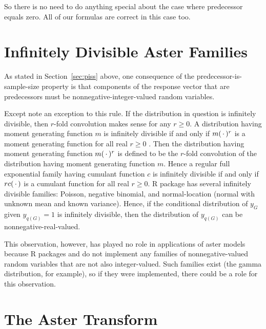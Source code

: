 So there is no need to do anything special about the case where predecessor
equals zero.  All of our formulas are correct in this case too.

\section{Infinitely Divisible Aster Families}
\label{sec:infinitely-divisible}

As stated in Section~\ref{sec:piss} above,
one consequence of the predecessor-is-sample-size property is that
components of the response vector
that are predecessors must be
nonnegative-integer-valued random variables.

Except \citet{aster1} note an exception to this rule.  If the distribution
in question is infinitely divisible, then $r$-fold convolution makes sense
for any $r \ge 0$.  A distribution having moment generating function $m$
is infinitely divisible if and only if $m(\,\cdot\,)^r$ is a moment generating
function for all real $r \ge 0$ \citep[Corollary~4.2.2]{cuppens}.
Then the distribution having moment
generating function $m(\,\cdot\,)^r$ is defined to be the $r$-fold convolution
of the distribution having moment generating function $m$.
Hence a regular full exponential family having cumulant function $c$
is infinitely divisible if and only if $r c(\,\cdot\,)$ is a cumulant
function for all real $r \ge 0$.
R package  \citep{aster-package} has several infinitely divisible
families: Poisson, negative binomial, and normal-location
(normal with unknown mean and known variance).
Hence, if the conditional distribution of $y_G$ given $y_{q(G)} = 1$
is infinitely divisible, then
the distribution of $y_{q(G)}$ can be nonnegative-real-valued.

This observation, however, has played no role in applications of aster models
because R packages  and  do not implement any
families of nonnegative-valued random variables that are not
also integer-valued.  Such families exist (the gamma distribution,
for example), so if they were implemented, there could be a role for this
observation.

\section{The Aster Transform}
\label{sec:aster-transform}

